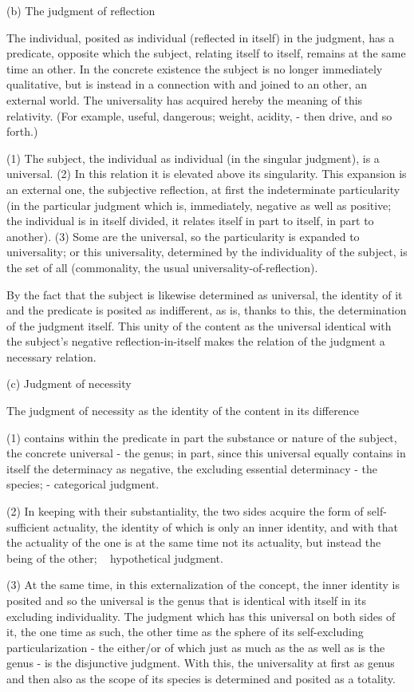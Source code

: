 (b) The judgment of reflection

The individual, posited as individual
(reflected in itself) in the judgment,
has a predicate, opposite which the subject,
relating itself to itself,
remains at the same time an other.
In the concrete existence the subject is no longer immediately qualitative,
but is instead in a connection with and joined to an other, an external world.
The universality has acquired hereby the meaning of this relativity.
(For example, useful, dangerous; weight, acidity, - then drive, and so forth.)

(1) The subject, the individual as individual
(in the singular judgment), is a universal.
(2) In this relation it is elevated above its singularity.
This expansion is an external one, the subjective reflection,
at first the indeterminate particularity
(in the particular judgment
which is, immediately, negative as well as positive;
the individual is in itself divided,
it relates itself in part to itself,
in part to another).
(3) Some are the universal, so the particularity is expanded to universality;
or this universality, determined by the individuality of the subject,
is the set of all (commonality, the usual universality-of-reflection).

By the fact that the subject is likewise determined as universal,
the identity of it and the predicate is posited as indifferent,
as is, thanks to this, the determination of the judgment itself.
This unity of the content as the universal identical with
the subject's negative reflection-in-itself makes
the relation of the judgment a necessary relation.

(c) Judgment of necessity

The judgment of necessity as the identity of the content in its difference

(1) contains within the predicate in part the substance or nature of the
subject, the concrete universal - the genus; in part, since this universal
equally contains in itself the determinacy as negative, the excluding essential
determinacy - the species; - categorical judgment.

(2) In keeping with their substantiality, the two sides acquire the form
of self-sufficient actuality, the identity of which is only an inner identity,
and with that the actuality of the one is at the same time not its actuality,
but instead the being of the other; ~ hypothetical judgment.

(3) At the same time, in this externalization of the concept, the inner
identity is posited and so the universal is the genus that is identical with
itself in its excluding individuality. The judgment which has this universal
on both sides of it, the one time as such, the other time as the sphere of
its self-excluding particularization - the either/or of which just as much
as the as well as is the genus - is the disjunctive judgment. With this, the
universality at first as genus and then also as the scope of its species is
determined and posited as a totality.

